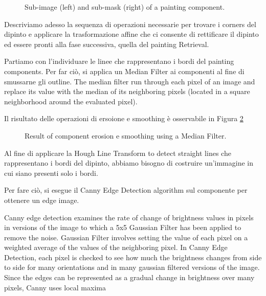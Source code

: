 \documentclass[10pt,twocolumn,letterpaper]{article}
\begin{document}
\begin{figure}[t]
   \begin{center}
   \fbox{\rule{0pt}{2in} \rule{0.9\linewidth}{0pt}}
   \end{center}
      \caption{Sub-image (left) and sub-mask (right) of a painting component.}
   \label{fig:subImageMask}
\end{figure}

Descriviamo adesso la sequenza di operazioni necessarie per trovare i corners del dipinto e applicare la trasformazione affine che ci consente di rettificare il dipinto ed essere pronti alla fase successiva, quella del painting Retrieval.

Partiamo con l'individuare le linee che rappresentano i bordi del painting components. Per far ciò, si applica un Median Filter ai componenti al fine di smussarne gli outline. The median filter run through each pixel of an image and replace its value with the median of its neighboring pixels (located in a square neighborhood around the evaluated pixel). 

Il risultato delle operazioni di ersoione e smoothing è osservabile in Figura \ref{fig:erosionAndMedianFilter}

\begin{figure}[t]
   \begin{center}
   \fbox{\rule{0pt}{2in} \rule{0.9\linewidth}{0pt}}
   \end{center}
      \caption{Result of component erosion e smoothing using a Median Filter.}
   \label{fig:erosionAndMedianFilter}
\end{figure}

Al fine di applicare la Hough Line Transform to detect straight lines che rappresentano i bordi del dipinto, abbiamo bisogno di costruire un'immagine in cui siano presenti solo i bordi. 

Per fare ciò, si esegue il Canny Edge Detection \cite{canny1986computational} algorithm sul componente per ottenere un edge image. 

Canny edge detection examines the rate of change of brightness values in pixels in versions of the image to which a 5x5 Gaussian Filter has been applied to remove the noise. Gaussian Filter involves setting the value of each pixel on a weighted average of the values of the neighboring pixel. In Canny Edge Detection, each pixel is checked to see how much the brightness changes from side to side for many orientations and in many gaussian filtered versions of the image. Since the edges can be represented as a gradual change in brightness over many pixels, Canny uses local maxima
\end{document}
